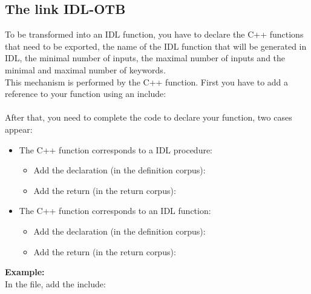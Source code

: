 \subsection{The link IDL-OTB}
To be transformed into an IDL function, you have to declare the C++ functions that need to be exported, the name of the IDL function 
that will be generated in IDL, the minimal number of inputs, the maximal number of inputs and the minimal and maximal number of keywords. \\
This mechanism is performed by the  C++ function.
First you have to add a reference to your function using an include:\\
\\
After that, you need to complete the  code to declare your function, two cases appear:
\begin{itemize}
\item The C++ function corresponds to a IDL procedure:
  \begin{itemize}
  \item Add the declaration (in the definition corpus):\\
  \item Add the return (in the return corpus):\\
  \end{itemize}
\item The C++ function corresponds to an IDL function:
  \begin{itemize}
  \item Add the declaration (in the definition corpus):\\
  \item Add the return (in the return corpus):\\
  \end{itemize}
\end{itemize}

\textbf{Example:}\\
      In the  file, add the include:\\
      \\

